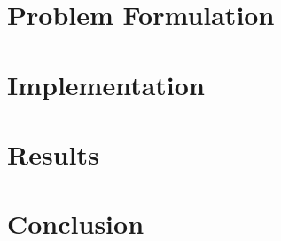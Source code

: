 \documentclass[11pt, journal]{IEEEtran}
\begin{document}
\section{Problem Formulation }


\section{Implementation}


\section{Results}


\section{Conclusion}




\end{document}
